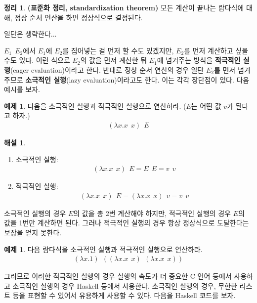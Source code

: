 \documentclass[b5paper, 11pt]{book}
\theoremstyle{definition}
\newtheorem{thm}[defn]{정리}
\newtheorem{ex}[defn]{예제}
\newtheorem*{ans*}{해설}
\newenvironment{pf*}{\pushQED{\qed}\pf}
{\popQED\endpf}
\begin{document}
\begin{thm}
    \textbf{(표준화 정리, standardization theorem)} 모든 계산이 끝나는 람다식에 대해, 정상 순서 연산을 하면 정상식으로 결정된다.
\end{thm}
\begin{pf*}
    일단은 생략한다...
\end{pf*}
$E_1 \;\, E_2$에서 $E_1$에 $E_2$를 집어넣는 걸 먼저 할 수도 있겠지만, $E_2$를 먼저 계산하고 싶을 수도 있다. 이런 식으로 $E_2$의 값을 먼저 계산한 뒤 $E_1$에 넘겨주는 방식을 \textbf{적극적인 실행}(eager evaluation)이라고 한다. 반대로 정상 순서 연산의 경우 일단 $E_2$를 먼저 넘겨주므로 \textbf{소극적인 실행}(lazy evaluation)이라고도 한다. 이는 각각 장단점이 있다. 다음 예시를 보자.
\begin{ex}
    다음을 소극적인 실행과 적극적인 실행으로 연산하라. ($E$는 어떤 값 $v$가 된다고 하자.)
    \begin{align*}
        (\lambda x. x \;\, x) \;\, E
    \end{align*}
\end{ex}
\begin{ans*}
    \begin{enumerate}
        \item 소극적인 실행:
        \begin{align*}
            (\lambda x. x \;\, x) \;\, E = E \;\, E = v \;\, v
        \end{align*}
        \item 적극적인 실행:
        \begin{align*}
            (\lambda x. x \;\, x) \;\, E =  (\lambda x. x \;\, x) \;\, v = v \;\, v
        \end{align*}
    \end{enumerate}
\end{ans*}
소극적인 실행의 경우 $E$의 값을 총 2번 계산해야 하지만, 적극적인 실행의 경우 $E$의 값을 1번만 계산하면 된다. 그러나 적극적인 실행의 경우 항상 정상식으로 도달한다는 보장을 얻지 못한다. 
\begin{ex}
    다음 람다식을 소극적인 실행과 적극적인 실행으로 연산하라.
    \begin{align*}
        (\lambda x. 1) \;\, ((\lambda x. x \;\, x) \;\, (\lambda x. x \;\, x))
    \end{align*}
\end{ex}
그러므로 이러한 적극적인 실행의 경우 실행의 속도가 더 중요한 C 언어 등에서 사용하고 소극적인 실행의 경우 Haskell 등에서 사용한다. 소극적인 실행의 경우, 무한한 리스트 등을 표현할 수 있어서 유용하게 사용할 수 있다. 다음을 Haskell 코드를 보자.
\end{document}
